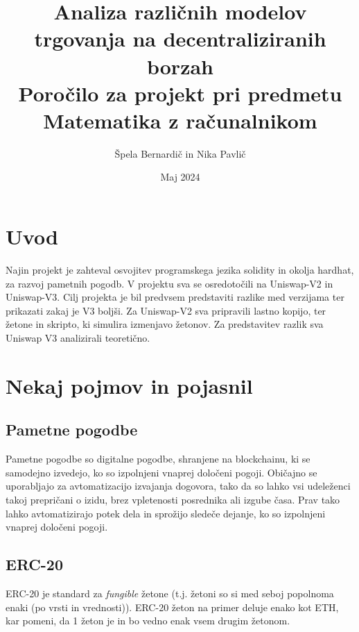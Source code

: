 \documentclass[a4paper,12pt]{article}%
\title{Analiza različnih modelov trgovanja na decentraliziranih borzah \\ \large Poročilo za projekt pri predmetu Matematika z računalnikom}
\date{Maj 2024}
\author{Špela Bernardič in Nika Pavlič}
\begin{document}
\maketitle
\section{Uvod}

Najin projekt je zahteval osvojitev programskega jezika solidity in okolja hardhat, za razvoj pametnih pogodb. V projektu sva se osredotočili na Uniswap-V2 in Uniswap-V3. Cilj projekta je bil predvsem predstaviti razlike med verzijama ter prikazati zakaj je V3 boljši. Za Uniswap-V2 sva pripravili lastno kopijo, ter žetone in skripto, ki simulira izmenjavo žetonov. Za predstavitev razlik sva Uniswap V3 analizirali teoretično. 


\section{Nekaj pojmov in pojasnil} 

\subsection{Pametne pogodbe} 
Pametne pogodbe so digitalne pogodbe, shranjene na blockchainu, ki se samodejno izvedejo, ko so izpolnjeni vnaprej določeni pogoji.
Običajno se uporabljajo za avtomatizacijo izvajanja dogovora, tako da so lahko vsi udeleženci takoj prepričani o izidu, 
brez vpletenosti posrednika ali izgube časa. Prav tako lahko avtomatizirajo potek dela in sprožijo sledeče dejanje, 
ko so izpolnjeni vnaprej določeni pogoji.

\subsection{ERC-20 }

ERC-20 je standard za \textit{fungible} žetone (t.j. žetoni so si med seboj popolnoma enaki (po vrsti in vrednosti)). ERC-20 žeton na primer deluje enako kot ETH, kar pomeni, da 1 žeton je in bo vedno enak vsem drugim žetonom.






\end{document}
